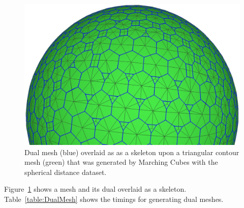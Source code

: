 \documentclass[10pt,journal,cspaper,compsoc]{IEEEtran}
\begin{document}
\begin{figure}[htb]
\begin{center}
\includegraphics[width=\linewidth]{DualMeshSkeleton.jpg}
\end{center}
\caption{Dual mesh (blue) overlaid as as a skeleton upon a triangular contour mesh (green) that was generated by Marching Cubes with the spherical distance dataset.}
\label{fig:DualMeshSkeleton}
\end{figure}

Figure~\ref{fig:DualMeshSkeleton} shows a mesh and its dual overlaid as a skeleton. Table~\ref{table:DualMesh} shows the timings for generating dual meshes.

\end{document}
